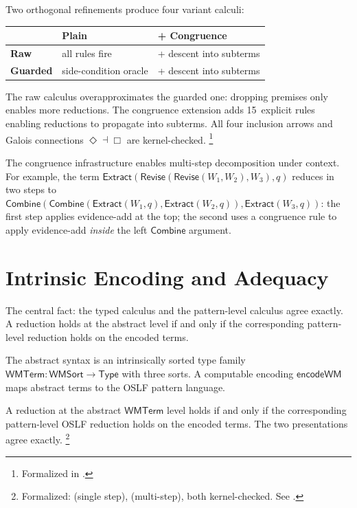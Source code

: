 \documentclass[11pt,openany]{report}
\begin{document}
Two orthogonal refinements produce four variant calculi:

\begin{center}
\begin{tabular}{lll}
\toprule
& \textbf{Plain} & \textbf{+ Congruence} \\
\midrule
\textbf{Raw} & all rules fire & + descent into subterms \\
\textbf{Guarded} & side-condition oracle & + descent into subterms \\
\bottomrule
\end{tabular}
\end{center}

\noindent
The raw calculus overapproximates the guarded one: dropping premises
only enables more reductions.  The congruence extension adds
15~explicit rules enabling reductions to propagate into subterms.
All four inclusion arrows and Galois connections
$\Diamond \dashv \Box$ are kernel-checked.%
\footnote{Formalized in
.}

The congruence infrastructure enables multi-step decomposition under
context.  For example, the term
$\mathsf{Extract}(\mathsf{Revise}(\mathsf{Revise}(W_1, W_2), W_3), q)$
reduces in two steps to
$\mathsf{Combine}(\mathsf{Combine}(\mathsf{Extract}(W_1, q),
\mathsf{Extract}(W_2, q)), \mathsf{Extract}(W_3, q))$:
the first step applies evidence-add at the top; the second uses a
congruence rule to apply evidence-add \emph{inside} the left
$\mathsf{Combine}$ argument.


\section{Intrinsic Encoding and Adequacy}

The central fact: the typed calculus and the pattern-level calculus
agree exactly.  A reduction holds at the abstract level if and only
if the corresponding pattern-level reduction holds on the encoded
terms.

The abstract syntax is an intrinsically sorted type family
$\mathsf{WMTerm} : \mathsf{WMSort} \to \mathsf{Type}$ with three
sorts.  A computable encoding $\mathsf{encodeWM}$ maps abstract
terms to the OSLF pattern language.

\begin{theorem}
A reduction at the abstract $\mathsf{WMTerm}$ level holds if and only
if the corresponding pattern-level OSLF reduction holds on the encoded
terms.  The two presentations agree exactly.%
\footnote{Formalized:  (single step),
 (multi-step), both kernel-checked.
See .}
\end{theorem}
\end{document}
